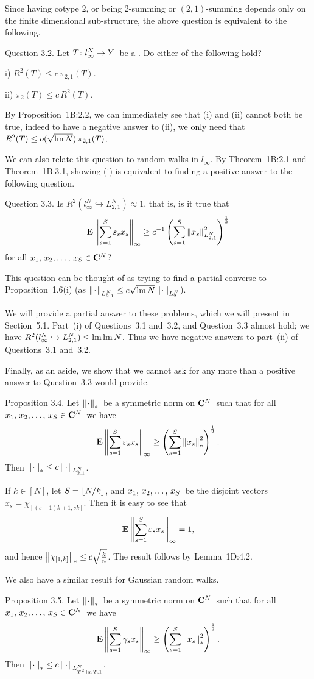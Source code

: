 Since having cotype $2$, or being $2$-summing or $(2,1)$-summing
depends only
on the finite dimensional sub-structure, the above question is equivalent
to
the following.
 
\proclaim Question 3.2. Let $T\colon l_\infty^N\to Y$\ be a \blotaBs. Do either of
the following
hold?
\item{i)} $R^2(T) \le c \,\pi_{2,1}(T) $.
\item{ii)} $\pi_2(T) \le c \,R^2(T) $.
 
By Proposition~1B:2.2, we can immediately see that (i) and (ii) cannot
both be
true, indeed to have a negative answer to (ii), we only need that
$R^2(T) \le
o(\sqrt{\mathop{\rm lm}\nolimits N}) \,\pi_{2,1}(T) $.
 
We can also relate this question to random walks in $l_\infty$. By
Theorem~1B:2.1 and Theorem~1B:3.1, showing (i) is equivalent to finding
a positive answer to the following question.
 
\proclaim Question 3.3. Is $R^2(l_\infty^N \hookrightarrow L_{2,1}^N)
\approx 1$,
that is, is it true that
$$ {\bf E} \left\| \sum_{s=1}^S \varepsilon_s x_s \right\|_\infty \ge c^{-1} \left( \sum_{s=1}^S \left\| x_s \right\|_{L_{2,1}^N}^2 \right)^{1\over2} $$
for all $\xS\in\C^N$?
 
This question can be thought of as trying to find a partial converse
to
Proposition~1.6(i) (as $\left\| \kern0.8pt\cdot\kern0.8pt \right\|_{L_{2,1}^N} \le c \sqrt{\mathop{\rm lm}\nolimits N}
\left\| \kern0.8pt\cdot\kern0.8pt \right\|_{L_2^N}$).
 
We will provide a partial answer to these problems, which we will
present in
Section~5.1. Part~(i) of Questions~3.1 and~3.2, and Question~3.3
almost hold; we
have $R^2(l_\infty^N\hookrightarrow L_{2,1}^N) \le \mathop{\rm lm}\nolimits\mathop{\rm lm}\nolimits N$. Thus
we have
negative answers to part~(ii) of Questions~3.1 and~3.2.
 
\bigskip
Finally, as an aside, we show that we cannot ask for any more than
a positive
answer to Question~3.3 would provide.
 
\proclaim Proposition 3.4. Let $\left\| \kern0.8pt\cdot\kern0.8pt \right\|_*$\ be a symmetric norm
on ${\bf C}^N$\ such that
for all $\xS\in\C^N$\ we have
$$ {\bf E} \left\| \sum_{s=1}^S \varepsilon_s x_s \right\|_\infty
   \ge \left(\sum_{s=1}^S \left\| x_s \right\|_*^2\right)^{1\over2}. $$
Then $\left\| \kern0.8pt\cdot\kern0.8pt \right\|_* \le c \left\| \kern0.8pt\cdot\kern0.8pt \right\|_{L_{2,1}^N} $.
 
\Proof If $k\in[N]$, let $S=\lfloor N/k\rfloor$, and $\xS$\ be the disjoint
vectors
$x_s=\chi_{[(s-1)k+1,sk]} $. Then it is easy to see that
$$ {\bf E}\left\| \sum_{s=1}^S \varepsilon_s x_s \right\|_\infty = 1 ,$$
and hence $\left\| \chi_{[1,k]} \right\|_* \le c \sqrt{k\over n} $. The result
follows
by Lemma~1D:4.2.
\endproof
 
We also have a similar result for Gaussian random walks.
 
\proclaim Proposition 3.5. Let $\left\| \kern0.8pt\cdot\kern0.8pt \right\|_*$\ be a symmetric norm
on ${\bf C}^N$\ such that
for all $\xS\in\C^N$\ we have
$$ {\bf E} \left\| \sum_{s=1}^S \gamma_s x_s \right\|_\infty
   \ge \left(\sum_{s=1}^S \left\| x_s \right\|_*^2\right)^{1\over2}. $$
Then $\left\| \kern0.8pt\cdot\kern0.8pt \right\|_* \le c \left\| \kern0.8pt\cdot\kern0.8pt \right\|_{L_{T^2\mathop{\rm lm}\nolimits T,1}^N} $.
 
